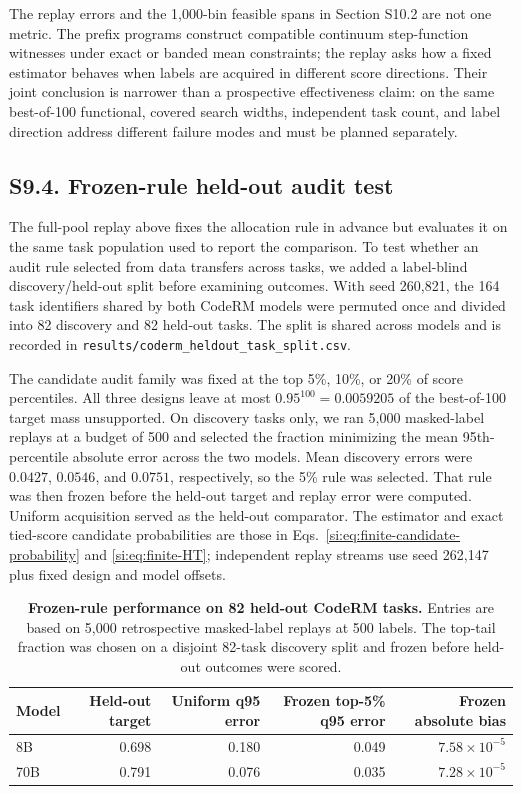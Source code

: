 The replay errors and the 1,000-bin feasible spans in Section S10.2 are not one metric. The prefix programs construct compatible continuum step-function witnesses under exact or banded mean constraints; the replay asks how a fixed estimator behaves when labels are acquired in different score directions. Their joint conclusion is narrower than a prospective effectiveness claim: on the same best-of-100 functional, covered search widths, independent task count, and label direction address different failure modes and must be planned separately.

\subsection*{S9.4. Frozen-rule held-out audit test}

The full-pool replay above fixes the allocation rule in advance but evaluates it on the same task population used to report the comparison. To test whether an audit rule selected from data transfers across tasks, we added a label-blind discovery/held-out split before examining outcomes. With seed 260,821, the 164 task identifiers shared by both CodeRM models were permuted once and divided into 82 discovery and 82 held-out tasks. The split is shared across models and is recorded in \texttt{results/coderm\_heldout\_task\_split.csv}.

The candidate audit family was fixed at the top 5\%, 10\%, or 20\% of score percentiles. All three designs leave at most $0.95^{100}=0.0059205$ of the best-of-100 target mass unsupported. On discovery tasks only, we ran 5,000 masked-label replays at a budget of 500 and selected the fraction minimizing the mean 95th-percentile absolute error across the two models. Mean discovery errors were $0.0427$, $0.0546$, and $0.0751$, respectively, so the 5\% rule was selected. That rule was then frozen before the held-out target and replay error were computed. Uniform acquisition served as the held-out comparator. The estimator and exact tied-score candidate probabilities are those in Eqs.~\ref{si:eq:finite-candidate-probability} and \ref{si:eq:finite-HT}; independent replay streams use seed 262,147 plus fixed design and model offsets.

\begin{table}[h]
\centering
\caption{\textbf{Frozen-rule performance on 82 held-out CodeRM tasks.} Entries are based on 5,000 retrospective masked-label replays at 500 labels. The top-tail fraction was chosen on a disjoint 82-task discovery split and frozen before held-out outcomes were scored.}
\label{si:tab:heldout-audit}
\begin{tabular}{lrrrr}
\toprule
Model & Held-out target & Uniform q95 error & Frozen top-5\% q95 error & Frozen absolute bias \\
\midrule
8B & 0.698 & 0.180 & 0.049 & $7.58\times10^{-5}$ \\
70B & 0.791 & 0.076 & 0.035 & $7.28\times10^{-5}$ \\
\bottomrule
\end{tabular}
\end{table}

